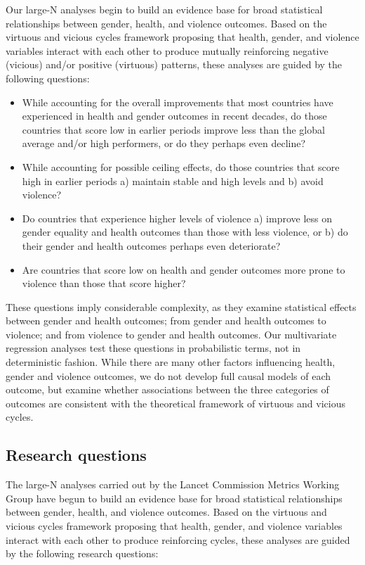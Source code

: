 \documentclass[12pt]{article}
\begin{document}
Our large-N analyses begin to build an evidence base for broad statistical relationships between gender, health, and violence outcomes.
Based on the virtuous and vicious cycles framework proposing that health, gender, and violence variables interact with each other to produce mutually reinforcing negative (vicious) and/or positive (virtuous) patterns, these analyses are guided by the following questions:
\begin{itemize}
\item While accounting for the overall improvements that most countries have experienced in health and gender outcomes in recent decades, do those countries that score low in earlier periods improve less than the global average and/or high performers, or do they perhaps even decline?
\item While accounting for possible ceiling effects, do those countries that score high in earlier periods a) maintain stable and high levels and b) avoid violence?
\item Do countries that experience higher levels of violence a) improve less on gender equality and health outcomes than those with less violence, or b) do their gender and health outcomes perhaps even deteriorate?
\item Are countries that score low on health and gender outcomes more prone to violence than those that score higher?
\end{itemize}

These questions imply considerable complexity, as they examine statistical effects between gender and health outcomes; from gender and health outcomes to violence; and from violence to gender and health outcomes.
Our multivariate regression analyses test these questions in probabilistic terms, not in deterministic fashion.
While there are many other factors influencing health, gender and violence outcomes, we do not develop full causal models of each outcome, but examine whether associations between the three categories of outcomes are consistent with the theoretical framework of virtuous and vicious cycles.

\subsection{Research questions}

The large-N analyses carried out by the Lancet Commission Metrics Working Group have begun to build an evidence base for broad statistical relationships between gender, health, and violence outcomes. Based on the virtuous and vicious cycles framework proposing that health, gender, and violence variables interact with each other to produce reinforcing cycles, these analyses are guided by the following research questions:
\end{document}

